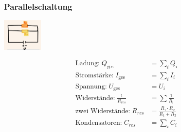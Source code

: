 \subsubsection*{Parallelschaltung}
\vspace{-1mm}
\begin{minipage}{0.39\linewidth}
    \begin{footnotesize}
        \begin{center}
            \vspace{2mm}
            \includegraphics[width = 20mm]{src/images/parallelschaltung.png}
        \end{center}
    \end{footnotesize}
\end{minipage}
\begin{minipage}{0.6\linewidth}
    \begin{scriptsize}
        \begin{center}
            \begin{align*}
                \text{Ladung:} \; Q_{\text{ges}} &= \sum\limits_i Q_i\\
                \text{Stromstärke:} \; I_{\text{ges}} &= \sum\limits_i I_i\\
                \text{Spannung:} \; U_{\text{ges}} &= U_i\\
                \text{Widerstände:} \; \frac{1}{R_{res}} &= \sum \frac{1}{R_i}\\
                \text{zwei Widerstände:} \; R_{res} &= \frac{R_1 \cdot R_2}{R_1 + R_2}\\
                \text{Kondensatoren:} \; C_{res} &= \sum\limits_i C_i
            \end{align*}
        \end{center}
    \end{scriptsize}
\end{minipage}